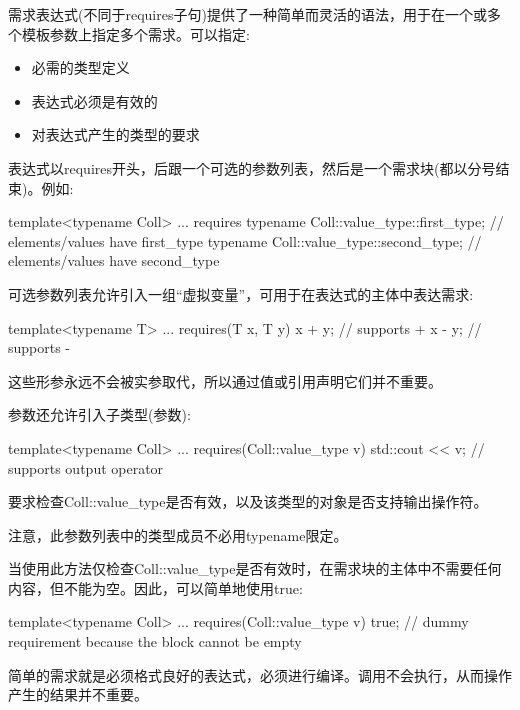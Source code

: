 

需求表达式(不同于requires子句)提供了一种简单而灵活的语法，用于在一个或多个模板参数上指定多个需求。可以指定:

\begin{itemize}
\item
必需的类型定义

\item
表达式必须是有效的

\item
对表达式产生的类型的要求
\end{itemize}

表达式以requires开头，后跟一个可选的参数列表，然后是一个需求块(都以分号结束)。例如:

\begin{cpp}
template<typename Coll>
... requires {
		typename Coll::value_type::first_type; // elements/values have first_type
		typename Coll::value_type::second_type; // elements/values have second_type
	}
\end{cpp}

可选参数列表允许引入一组“虚拟变量”，可用于在表达式的主体中表达需求:

\begin{cpp}
template<typename T>
... requires(T x, T y) {
		x + y; // supports +
		x - y; // supports -
	}
\end{cpp}

这些形参永远不会被实参取代，所以通过值或引用声明它们并不重要。

参数还允许引入子类型(参数):

\begin{cpp}
template<typename Coll>
... requires(Coll::value_type v) {
		std::cout << v; // supports output operator
	}
\end{cpp}

要求检查Coll::value\_type是否有效，以及该类型的对象是否支持输出操作符。

注意，此参数列表中的类型成员不必用typename限定。

当使用此方法仅检查Coll::value\_type是否有效时，在需求块的主体中不需要任何内容，但不能为空。因此，可以简单地使用true:

\begin{cpp}
template<typename Coll>
... requires(Coll::value_type v) {
		true; // dummy requirement because the block cannot be empty
	}
\end{cpp}


简单的需求就是必须格式良好的表达式，必须进行编译。调用不会执行，从而操作产生的结果并不重要。

